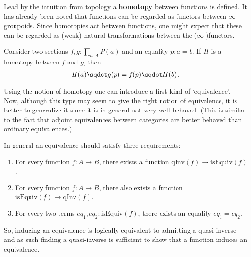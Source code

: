     Lead by the intuition from topology a \textbf{homotopy} between functions is defined.
    It has already been noted that functions can be regarded as functors between $\infty$-groupoids. Since homotopies act between functions, one might expect that these can be regarded as (weak) natural transformations between the ($\infty$-)functors.
    \begin{property}
        Consider two sections $f,g:\prod_{a:A}P(a)$ and an equality $p:a=b$. If $H$ is a homotopy between $f$ and $g$, then
        \begin{gather}
            H(a)\sqdot g(p) = f(p)\sqdot H(b)\,.
        \end{gather}
    \end{property}

    Using the notion of homotopy one can introduce a first kind of `equivalence'.
    Now, although this type may seem to give the right notion of equivalence, it is better to generalize it since it is in general not very well-behaved. (This is similar to the fact that adjoint equivalences between categories are better behaved than ordinary equivalences.)

    In general an equivalence should satisfy three requirements:
    \begin{enumerate}
        \item For every function $f:A\rightarrow B$, there exists a function $\mathrm{qInv}(f)\rightarrow\mathrm{isEquiv}(f)$.
        \item For every function $f:A\rightarrow B$, there also exists a function $\mathrm{isEquiv}(f)\rightarrow\mathrm{qInv}(f)$.
        \item For every two terms $eq_1,eq_2:\mathrm{isEquiv}(f)$, there exists an equality $eq_1=eq_2$.
    \end{enumerate}
    So, inducing an equivalence is logically equivalent to admitting a quasi-inverse and as such finding a quasi-inverse is sufficient to show that a function induces an equivalence.

